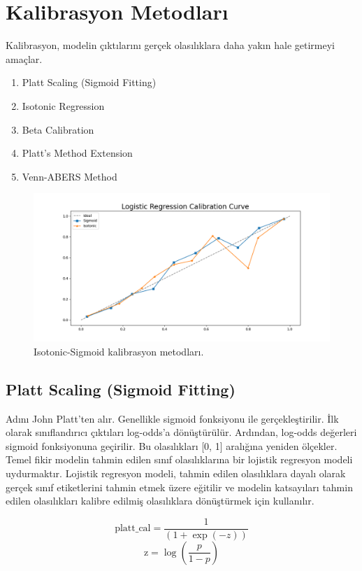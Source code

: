 \section{Kalibrasyon Metodları}
Kalibrasyon, modelin çıktılarını gerçek olasılıklara daha yakın hale getirmeyi amaçlar.
\begin{enumerate}
    \item Platt Scaling (Sigmoid Fitting)
    \item Isotonic Regression
    \item Beta Calibration
    \item Platt's Method Extension
    \item Venn-ABERS Method
\end{enumerate}

\begin{figure}[h]
    \centering
    \includegraphics[width=1\textwidth]{images/calibration.png}
    \caption{Isotonic-Sigmoid kalibrasyon metodları.}
    \label{fig:enter-label}
\end{figure}

\subsection{Platt Scaling (Sigmoid Fitting)}
Adını John Platt'ten alır. Genellikle sigmoid fonksiyonu ile gerçekleştirilir. İlk olarak sınıflandırıcı çıktıları log-odds'a dönüştürülür. Ardından, log-odds değerleri sigmoid fonksiyonuna geçirilir. Bu olasılıkları [0, 1] aralığına yeniden ölçekler. Temel fikir modelin tahmin edilen sınıf olasılıklarına bir lojistik regresyon modeli uydurmaktır. Lojistik regresyon modeli, tahmin edilen olasılıklara dayalı olarak gerçek sınıf etiketlerini tahmin etmek üzere eğitilir ve modelin katsayıları tahmin edilen olasılıkları kalibre edilmiş olasılıklara dönüştürmek için kullanılır.

\[\text{platt\_cal} = \frac{1}{(1 + \exp(-z))}\]
\[\text{z} = \log(\frac{p}{1 - p})\]

